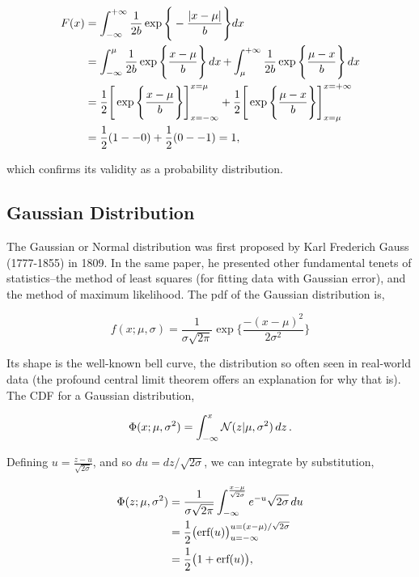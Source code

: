 \documentclass[11pt]{amsart}
\begin{document}
\begin{align}
F(x) &= \int_{-\infty}^{+\infty} \frac{1}{2b}\exp\Bigg\{-\frac{|x - \mu|}{b}\Bigg\}dx \notag \\
&= \int_{-\infty}^{\mu} \frac{1}{2b}\exp\Bigg\{\frac{x - \mu}{b}\Bigg\}\mathop{dx} + \int_{\mu}^{+\infty} \frac{1}{2b}\exp\Bigg\{\frac{\mu - x}{b}\Bigg\}\mathop{dx} \notag \\
&= \frac{1}{2}\Bigg[\exp\Bigg\{\frac{x - \mu}{b}\Bigg\}\Bigg]_{x=-\infty}^{x=\mu} + \frac{1}{2}\Bigg[\exp\Bigg\{\frac{\mu - x}{b}\Bigg\}\Bigg]_{x=\mu}^{x=+\infty} \notag \\
&= \frac{1}{2}(1 - -0) + \frac{1}{2}(0 - -1) \notag
= 1, \notag
\end{align}

which confirms its validity as a probability distribution.

\subsection{Gaussian Distribution}

The Gaussian or Normal distribution was first proposed by Karl Frederich Gauss (1777-1855) in 1809. In the same paper, he presented other fundamental tenets of statistics--the method of least squares (for fitting data with Gaussian error), and the method of maximum likelihood. The pdf of the Gaussian distribution is,

$$f(x;\mu, \sigma) = \frac{1}{\sigma\sqrt{2\pi}}\exp\Bigg\{\frac{-(x - \mu)^2}{2\sigma^2}\Bigg\}$$

Its shape is the well-known bell curve, the distribution so often seen in real-world data (the profound central limit theorem offers an explanation for why that is). The CDF for a Gaussian distribution,

$$\Phi({x;\mu,\sigma^2}) = \int_{-\infty}^{x}\mathcal{N}(z | \mu, \sigma^2)\mathop{dz}. \notag$$

Defining $u = \frac{z - u}{\sqrt{2\sigma}}$, and so $du = dz/\sqrt{2\sigma}$, we can integrate by substitution,

\begin{align}
\Phi({z;\mu,\sigma^2}) &= \frac{1}{\sigma\sqrt{2\pi}}\int_{-\infty}^{\frac{x - \mu}{\sqrt{2\sigma}}} e^{-u} \sqrt{2\sigma}\mathop{du} \notag \\
&= \frac{1}{2}\big(\text{erf}(u)\big)_{u=-\infty}^{u=(x-\mu)/\sqrt{2\sigma}} \notag \\
&= \frac{1}{2}\big(1 + \text{erf}(u)\big), \notag
\end{align}
\end{document}
